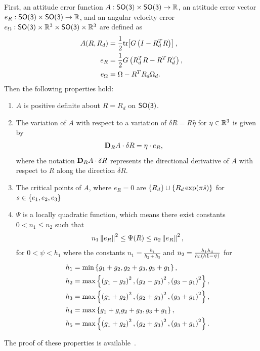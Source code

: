 \documentclass[journal]{new-aiaa}
\begin{document}
First, an attitude error function \(A : \mathsf{SO(3)} \times \mathsf{SO(3)}  \to \mathbb{R} \), an attitude error vector \( e_R : \mathsf{SO(3)} \times \mathsf{SO(3)} \to \mathbb{R} \), and an angular velocity error \( e_\Omega : \mathsf{SO(3)} \times \mathbb{R}^3 \times \mathsf{SO(3)} \times \mathbb{R}^3 \) are defined as
\begin{subequations}\label{eq:attitude_error_function}
\begin{align}
    A(R, R_d) &= \frac{1}{2}  \mathrm{tr}\negthickspace\left[ G\left( I - R_d^T R \right) \right], \label{eq:A} \\
    e_R &= \frac{1}{2} G \left( R_d^T R - R^T R_d^\vee \right), \label{eq:eRA}\\
    e_\Omega &= \Omega - R^T R_d \Omega_d \label{eq:eWA}.
\end{align}
\end{subequations}
Then the following properties hold:
\begin{enumerate}
    \item \label{item:prop_A_psd} \( A \) is  positive definite about \( R = R_d \) on \( \mathsf{SO(3)} \).
    \item \label{item:prop_eRA} The variation of \( A \) with respect to a variation of \( \delta R = R \hat{\eta} \) for \( \eta \in \mathbb{R}^3 \) is given by
	\begin{align}\label{eq:dirDiff_A}
		\mathbf{D}_{R} A \cdot \delta R &= \eta \cdot e_{R} ,
	\end{align}
	where the notation \( \mathbf{D}_{R} A \cdot \delta R \) represents the directional derivative of $A$ with respect to $R$ along the direction $\delta R$.
\item \label{item:prop_A_critical_points} The critical points of \( A \), where \( e_R = 0 \) are \( \left\{ R_d \right\} \cup \left\{ R_d \exp(\pi \hat s)  \right\} \) for \( s \in \left\{ e_1, e_2, e_3 \right\}\)
    \item \label{item:prop_A_quadratic} \( \Psi \) is a locally quadratic function, which means there exist constants \( 0 < n_1 \leq n_2 \) such that
    \begin{align}\label{eq:A_bound}
        n_1 \left\| e_R \right\|^2 \leq \Psi(R) \leq n_2 \left\| e_R \right\|^2 ,
    \end{align}
    for $0<\psi < h_1 $ where the constants \( n_1 = \frac{h_1}{h_2 + h_3} \) and \( n_2 = \frac{h_1 h_4}{h_5 \left( h1 - \psi \right) }\) for
	\begin{align*}
		h_1 &= \min\left\{ g_1 + g_2, g_2 + g_3 , g_3 + g_1 \right\} ,\\
		h_2 &= \max\left\{ \left( g_1 -g_2 \right)^2,\left( g_2 -g_3 \right)^2 , \left( g_3 -g_1 \right)^2 \right\} ,\\
		h_3 &= \max\left\{ \left( g_1 + g_2 \right)^2, \left( g_2 + g_3 \right)^2 , \left( g_3 + g_1 \right)^2 \right\}, \\		
        h_4 &= \max\left\{ g_1 + g_, g_2 +g_3, g_3 + g_1 \right\}, \\
        h_5 &= \max\left\{ \left( g_1 + g_2 \right)^2, \left( g_2 + g_3 \right)^2, \left( g_3 + g_1 \right)^2 \right\}.
	\end{align*}
\end{enumerate}
The proof of these properties is available~\cite{kulumani2017a}.
\end{document}
